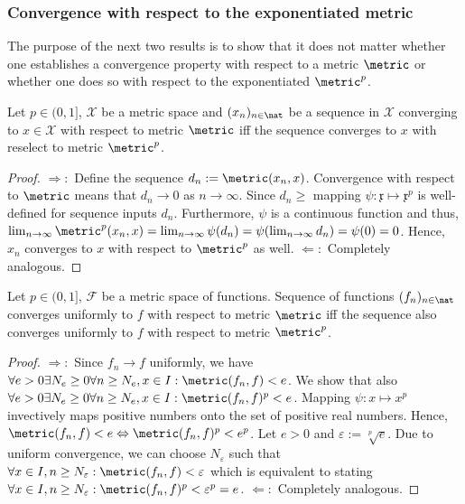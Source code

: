 \subsubsection{Convergence with respect to the exponentiated metric}
\label{sec:unifconvhoeldermetricequivmetricunifconv}
The purpose of the next two results is to show that it does not matter whether one establishes a convergence property with respect to a metric $\metric$ or whether one does so with respect to the exponentiated $\metric^p$.
\begin{lem}\label{lem:hoeldermetricconv}
Let $p \in (0,1]$, $\mathcal X$ be a metric space and $(x_n)_{n \in \nat}$ be a sequence in $\mathcal X$ converging to $x \in \mathcal X$ with respect to metric $\metric$ iff the sequence converges to $x$ with reselect to metric $\metric^p$.

\begin{proof}
$\Rightarrow:$
Define the sequence $d_n :=  \metric(x_n,x) $.
Convergence with respect to $\metric$ means that $d_n \to 0$ as $n \to \infty$. Since $d_n \geq$ mapping $ \psi: \mathfrak x \mapsto \mathfrak x^p$ is well-defined for sequence inputs $d_n$. Furthermore, $\psi$ is a continuous function and thus, 
$\lim_{n \to \infty} \metric^p(x_n,x) = \lim_{n \to \infty} \psi(d_n) =  \psi( \lim_{n \to \infty} d_n) = \psi (0)  =0$.
Hence, $x_n$ converges to $x$ with respect to $\metric^p$ as well.
$\Leftarrow:$ Completely analogous.

\end{proof}  
\end{lem}

\begin{lem}\label{lem:hoeldermetricconv}
Let $p \in  (0,1]$, $\mathcal F$ be a metric space of functions. Sequence of functions $(f_n)_{n \in \nat}$ converges uniformly to $f$ with respect to metric $\metric$ iff the sequence also converges uniformly to $f$ with respect to metric $\metric^p$.


\begin{proof} $\Rightarrow:$
Since $f_n \to f$ uniformly, we have 
$\forall e >0 \exists N_e \geq 0 \forall n \geq N_e, x \in I : \metric(f_n , f) < e$. We show that also $\forall e >0 \exists N_e \geq 0 \forall n \geq N_e, x \in I : \metric(f_n , f)^p < e$.
Mapping $\psi: x \mapsto x^p$ invectively maps positive numbers onto the set of positive real numbers. Hence, $\metric(f_n, f) < e \Leftrightarrow \metric(f_n , f)^p < e^p$.
Let $e >0$ and $ \varepsilon := \sqrt[p]{e}$. Due to uniform convergence, we can choose $ N_\varepsilon$ such that $\forall x \in I, n \geq N_\varepsilon: \metric(f_n , f) <\varepsilon$ which is equivalent to stating $\forall x \in I, n \geq N_\varepsilon: \metric(f_n , f)^p <\varepsilon^p = e$. $\Leftarrow:$ Completely analogous.
\end{proof}  
\end{lem}




